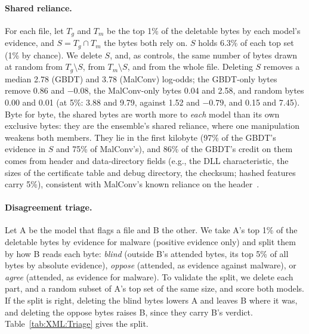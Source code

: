 \paragraph{Shared reliance.} For each file, let $T_g$ and $T_m$ be the top 1\% of the deletable bytes by each model's evidence, and $S = T_g \cap T_m$ the bytes both rely on. $S$ holds 6.3\% of each top set (1\% by chance). We delete $S$, and, as controls, the same number of bytes drawn at random from $T_g \setminus S$, from $T_m \setminus S$, and from the whole file. Deleting $S$ removes a median 2.78 (GBDT) and 3.78 (MalConv) log-odds; the GBDT-only bytes remove 0.86 and $-0.08$, the MalConv-only bytes 0.04 and 2.58, and random bytes 0.00 and 0.01 (at 5\%: 3.88 and 9.79, against 1.52 and $-0.79$, and 0.15 and 7.45). Byte for byte, the shared bytes are worth more to \emph{each} model than its own exclusive bytes: they are the ensemble's shared reliance, where one manipulation weakens both members. They lie in the first kilobyte (97\% of the GBDT's evidence in $S$ and 75\% of MalConv's), and 86\% of the GBDT's credit on them comes from header and data-directory fields (e.g., the DLL characteristic, the sizes of the certificate table and debug directory, the checksum; hashed features carry 5\%), consistent with MalConv's known reliance on the header~\cite{demetrio2019explaining}.

\paragraph{Disagreement triage.} Let A be the model that flags a file and B the other. We take A's top 1\% of the deletable bytes by evidence for malware (positive evidence only) and split them by how B reads each byte: \textit{blind} (outside B's attended bytes, its top 5\% of all bytes by absolute evidence), \textit{oppose} (attended, as evidence against malware), or \textit{agree} (attended, as evidence for malware). To validate the split, we delete each part, and a random subset of A's top set of the same size, and score both models. If the split is right, deleting the blind bytes lowers A and leaves B where it was, and deleting the oppose bytes raises B, since they carry B's verdict. Table~\ref{tab:XML:Triage} gives the split.

